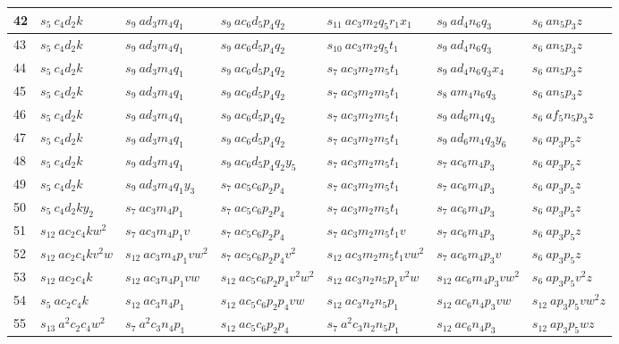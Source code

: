 \documentclass[preliminary,copyright,creativecommons]{eptcs}
\newcommand{\myway}[1]{\raisebox{-4pt}{\rule{0pt}{16pt}}\colorbox[rgb]{.7,.7,.7}{#1}}
\theoremstyle{remark}
\begin{document}
\begin{table}[h]
\begin{center}
\begin{tabular}{ | l | l | l | l | l | l | l | }
42 & $s_5~ c_4d_2k$ & $s_9~ ad_3m_4q_1$ & $s_9~ ac_6d_5p_4q_2$ & $s_{11}~ ac_3m_2q_5r_1x_1$ & $s_9~ ad_4n_6q_3$ & $s_6~ an_5p_3z$ \\ \hline
43 & $s_5~ c_4d_2k$ & $s_9~ ad_3m_4q_1$ & $s_9~ ac_6d_5p_4q_2$ & $s_{10}~ ac_3m_2q_5t_1$ & $s_9~ ad_4n_6q_3$ & $s_6~ an_5p_3z$ \\ \hline
44 & $s_5~ c_4d_2k$ & $s_9~ ad_3m_4q_1$ & $s_9~ ac_6d_5p_4q_2$ & $s_7~ ac_3m_2m_5t_1$ & $s_9~ ad_4n_6q_3x_4$ & $s_6~ an_5p_3z$ \\ \hline
45 & $s_5~ c_4d_2k$ & $s_9~ ad_3m_4q_1$ & $s_9~ ac_6d_5p_4q_2$ & $s_7~ ac_3m_2m_5t_1$ & $s_8~ am_4n_6q_3$ & $s_6~ an_5p_3z$ \\ \hline
46 & $s_5~ c_4d_2k$ & $s_9~ ad_3m_4q_1$ & $s_9~ ac_6d_5p_4q_2$ & $s_7~ ac_3m_2m_5t_1$ & $s_9~ ad_6m_4q_3$ & $s_6~ af_5n_5p_3z$ \\ \hline
47 & $s_5~ c_4d_2k$ & $s_9~ ad_3m_4q_1$ & $s_9~ ac_6d_5p_4q_2$ & $s_7~ ac_3m_2m_5t_1$ & $s_9~ ad_6m_4q_3y_6$ & \myway{$s_6~ ap_3p_5z$} \\ \hline
48 & $s_5~ c_4d_2k$ & $s_9~ ad_3m_4q_1$ & $s_9~ ac_6d_5p_4q_2y_5$ & $s_7~ ac_3m_2m_5t_1$ & \myway{$s_7~ ac_6m_4p_3$} & $s_6~ ap_3p_5z$ \\ \hline
49 & $s_5~ c_4d_2k$ & $s_9~ ad_3m_4q_1y_3$ & \myway{$s_7~ ac_5c_6p_2p_4$} & $s_7~ ac_3m_2m_5t_1$ & $s_7~ ac_6m_4p_3$ & $s_6~ ap_3p_5z$ \\ \hline
50 & $s_5~ c_4d_2ky_2$ & \myway{$s_7~ ac_3m_4p_1$} & $s_7~ ac_5c_6p_2p_4$ & $s_7~ ac_3m_2m_5t_1$ & $s_7~ ac_6m_4p_3$ & $s_6~ ap_3p_5z$ \\ \hline
51 & \myway{$s_{12}~ ac_2c_4kw^{2}$} & $s_7~ ac_3m_4p_1v$ & $s_7~ ac_5c_6p_2p_4$ & $s_7~ ac_3m_2m_5t_1v$ & $s_7~ ac_6m_4p_3$ & $s_6~ ap_3p_5z$ \\ \hline
52 & $s_{12}~ ac_2c_4kv^{2}w$ & $s_{12}~ ac_3m_4p_1vw^{2}$ & $s_7~ ac_5c_6p_2p_4v^{2}$ & $s_{12}~ ac_3m_2m_5t_1vw^{2}$ & $s_7~ ac_6m_4p_3v$ & $s_6~ ap_3p_5z$ \\ \hline
53 & $s_{12}~ ac_2c_4k$ & $s_{12}~ ac_3n_4p_1vw$ & $s_{12}~ ac_5c_6p_2p_4v^{2}w^{2}$ & $s_{12}~ ac_3n_2n_5p_1v^{2}w$ & $s_{12}~ ac_6m_4p_3vw^{2}$ & $s_6~ ap_3p_5v^{2}z$ \\ \hline
54 & $s_5~ ac_2c_4k$ & $s_{12}~ ac_3n_4p_1$ & $s_{12}~ ac_5c_6p_2p_4vw$ & $s_{12}~ ac_3n_2n_5p_1$ & $s_{12}~ ac_6n_4p_3vw$ & $s_{12}~ ap_3p_5vw^{2}z$ \\ \hline
55 & $s_{13}~ a^{2}c_2c_4w^{2}$ & $s_7~ a^{2}c_3n_4p_1$ & $s_{12}~ ac_5c_6p_2p_4$ & $s_7~ a^{2}c_3n_2n_5p_1$ & $s_{12}~ ac_6n_4p_3$ & $s_{12}~ ap_3p_5wz$ \\ \hline

\end{tabular}
\end{center}
\end{table}
\end{document}
